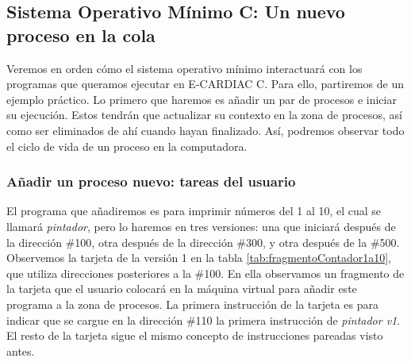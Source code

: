 \documentclass[letterpaper,12pt,oneside]{book}
\begin{document}
        \subsection{Sistema Operativo Mínimo C: Un nuevo proceso en la cola}
        
        Veremos en orden cómo el sistema operativo mínimo interactuará con los programas que queramos ejecutar en E-CARDIAC C. Para ello, 
        partiremos
		de un ejemplo práctico. Lo primero que haremos es añadir un par de procesos e iniciar su ejecución. Estos tendrán que actualizar
		su contexto en la zona de procesos, así como ser eliminados de ahí cuando hayan finalizado. Así, podremos observar todo
		el ciclo de vida de un proceso en la computadora.
  
		\subsubsection{Añadir un proceso nuevo: tareas del usuario }
		
			
		El programa que añadiremos es para imprimir números del 1 al 10, el cual se llamará \textit{pintador}, pero lo haremos en tres versiones: 
		una que 
		iniciará después de la 		
		dirección \#100, otra
		después de la dirección \#300, y otra después de la \#500. Observemos la tarjeta de la versión 1 en la tabla \ref{tab:fragmentoContador1a10}, que utiliza direcciones 
		posteriores a la \#100. En ella observamos 
		un fragmento de la tarjeta que el usuario colocará en la máquina virtual para añadir este programa a la zona de procesos. La primera 
		instrucción de la tarjeta  es para indicar que se cargue 
		en la dirección \#110 la primera instrucción de \textit{pintador v1}. El resto de la tarjeta sigue el mismo concepto de instrucciones pareadas 
		visto antes.
		
\end{document}
